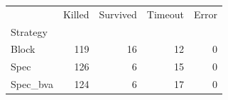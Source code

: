 \begin{tabular}{lrrrr}
\toprule
 & Killed & Survived & Timeout & Error \\
Strategy &  &  &  &  \\
\midrule
Block & 119 & 16 & 12 & 0 \\
Spec & 126 & 6 & 15 & 0 \\
Spec_bva & 124 & 6 & 17 & 0 \\
\bottomrule
\end{tabular}
